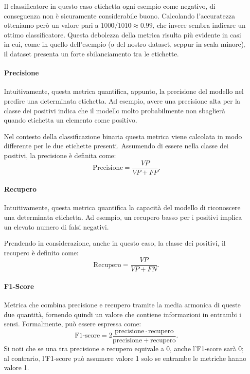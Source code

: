 \documentclass[../../main.tex]{subfiles}
\begin{document}
    Il classificatore in questo caso etichetta ogni esempio come negativo, di conseguenza non è sicuramente considerabile buono. Calcolando l'accuratezza otteniamo però un valore pari a $1000/1010 \approx 0.99$, che invece sembra indicare un ottimo classificatore. Questa debolezza della metrica risulta più evidente in casi in cui, come in quello dell'esempio (o del nostro dataset, seppur in scala minore), il dataset presenta un forte sbilanciamento tra le etichette.

    \paragraph{Precisione}
    Intuitivamente, questa metrica quantifica, appunto, la precisione del modello nel predire una determinata etichetta. Ad esempio, avere una precisione alta per la classe dei positivi indica che il modello molto probabilmente non sbaglierà quando etichetta un elemento come positivo.

    Nel contesto della classificazione binaria questa metrica viene calcolata in modo differente per le due etichette presenti. Assumendo di essere nella classe dei positivi, la precisione è definita come: 
    \begin{equation}
        \mathrm{Precisione} = \frac{VP}{VP + FP}.
    \end{equation}


    \paragraph{Recupero} Intuitivamente, questa metrica quantifica la capacità del modello di riconoscere una determinata etichetta. Ad esempio, un recupero basso per i positivi implica un elevato numero di falsi negativi.
    
    Prendendo in considerazione, anche in questo caso, la classe dei positivi, il recupero è definito come:
    \begin{equation}
        \mathrm{Recupero} = \frac{VP}{VP + FN}.      
    \end{equation}

    \paragraph{F1-Score}
    Metrica che combina precisione e recupero tramite la media armonica di queste due quantità, fornendo quindi un valore che contiene informazioni in entrambi i sensi. Formalmente, può essere espressa come: 
    \begin{equation}
        \text{F1-score} = 2\frac{\mathrm{precisione} \cdot \mathrm{recupero}}{\mathrm{precisione} + \mathrm{recupero}}.
    \end{equation}
    Si noti che se una tra precisione e recupero equivale a 0, anche l'F1-score sarà 0; al contrario, l'F1-score può assumere valore 1 solo se entrambe le metriche hanno valore 1.
\end{document}
